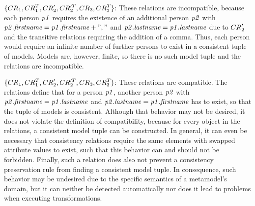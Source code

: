 \begin{example}
\begin{properdescription}
\item[$\setted{\consistencyrelation{CR}{1}, \consistencyrelation{CR}{1}^T,\consistencyrelation{CR}{2}', \consistencyrelation{CR}{2}'^T, \consistencyrelation{CR}{3}, \consistencyrelation{CR}{3}^T}$:]
These relations are incompatible, because each person $\mathit{p1}$ requires the existence of an additional person $\mathit{p2}$ with $\mathit{p2.firstname} = \mathit{p1.firstname} + ","$ and $\mathit{p2.lastname} = \mathit{p1.lastname}$ due to $\consistencyrelation{CR}{2}'$ and the transitive relations requiring the addition of a comma. Thus, each person would require an infinite number of further persons to exist in a consistent tuple of models. Models are, however, finite, so there is no such model tuple and the relations are incompatible.

\item[$\setted{\consistencyrelation{CR}{1}, \consistencyrelation{CR}{1}^T, \consistencyrelation{CR}{2}', \consistencyrelation{CR}{2}'^T, \consistencyrelation{CR}{3}, \consistencyrelation{CR}{3}^T}$:]
These relations are compatible. The relations define that for a person $\mathit{p1}$, another person $\mathit{p2}$ with $\mathit{p2.firstname} = \mathit{p1.lastname}$ and $\mathit{p2.lastname} = \mathit{p1.firstname}$ has to exist, so that the tuple of models is consistent.
Although that behavior may not be desired, it does not violate the definition of compatibility, because for every object in the relations, a consistent model tuple can be constructed.
In general, it can even be necessary that consistency relations require the same elements with swapped attribute values to exist, such that this behavior can and should not be forbidden.
Finally, such a relation does also not prevent a consistency preservation rule from finding a consistent model tuple.
In consequence, such behavior may be undesired due to the specific semantics of a metamodel's domain, but it can neither be detected automatically nor does it lead to problems when executing transformations.


\end{properdescription}
\end{example}
